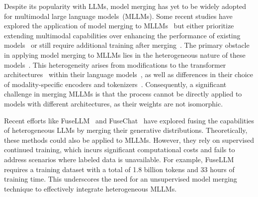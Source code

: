 Despite its popularity with LLMs, model merging has yet to be widely adopted for multimodal large language models~(MLLMs). Some recent studies have explored the application of model merging to MLLMs~\cite{sung2023empirical,modelcompose} but either prioritize extending multimodal capabilities over enhancing the performance of existing models~\cite{modelcompose} or still require additional training after merging~\cite{sung2023empirical}. The primary obstacle in applying model merging to MLLMs lies in the heterogeneous nature of these models~\cite{llava1.5, qwen2-vl, cogvlm2, llava-onevison, mplugowl2}.  This heterogeneity arises from modifications to the transformer architectures~\cite{attention} within their language models~\cite{cogvlm2,mplugowl2}, as well as differences in their choice of modality-specific encoders and tokenizers~\cite{qwen2-vl, cogvlm2}. Consequently, a significant challenge in merging MLLMs is that the process cannot be directly applied to models with different architectures, as their weights are not isomorphic.

Recent efforts like FuseLLM~\cite{fusellm} and FuseChat~\cite{fusechat} have explored fusing the capabilities of heterogeneous LLMs by merging their generative distributions. Theoretically, these methods could also be applied to MLLMs. However, they rely on supervised continued training, which incurs significant computational costs and fails to address scenarios where labeled data is unavailable. For example, FuseLLM requires a training dataset with a total of 1.8 billion tokens and 33 hours of training time. This underscores the need for an unsupervised model merging technique to effectively integrate heterogeneous MLLMs.


